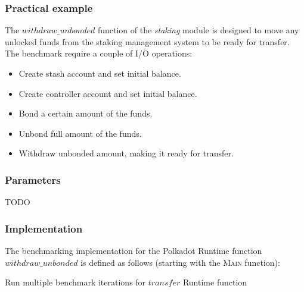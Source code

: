 \documentclass[11pt,a4paper]{article}
\begin{document}
\newpage
\subsubsection{Practical example}
The $withdraw\_unbonded$ function of the \textit{staking} module is designed to move any unlocked
funds from the staking management system to be ready for transfer. The benchmark require a couple
of I/O operations:

\begin{itemize}
  \item Create stash account and set initial balance.
  \item Create controller account and set initial balance.
  \item Bond a certain amount of the funds.
  \item Unbond full amount of the funds.
  \item Withdraw unbonded amount, making it ready for transfer.
\end{itemize}

\subsubsection*{Parameters}
TODO

\subsubsection*{Implementation}
The benchmarking implementation for the Polkadot Runtime function $withdraw\_unbonded$ is defined as
follows (starting with the \textsc{Main} function):
\newline


\begin{algorithm}[H]\label{sec:algo-benchmark-transfer}
  \caption{Run multiple benchmark iterations for $transfer$ Runtime function}
  \SetAlgoLined
  \BlankLine
  \BlankLine
\end{algorithm}
\end{document}
